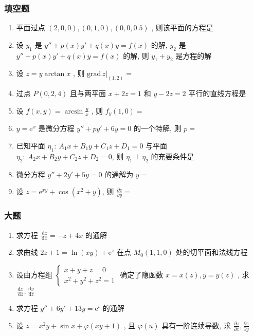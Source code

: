 \documentclass[cn,11pt,fancy,hide]{elegantbook}
\newcommand{\ee}{\mathrm{e}}
\newcommand{\dd}{\,\mathrm{d}}
\begin{document}
\subsubsection{填空题}
\begin{enumerate}
	\item 平面过点 $(2,0,0),(0,1,0),(0,0,0.5)$ , 则该平面的方程是\underline{\hspace{8pc}}
	\item 设 $y_1$ 是 $y''+p(x)y'+q(x)y=f(x)$ 的解, $y_2$ 是 $y''+p(x)y'+q(x)y=f(x)$ 的解, 则 $y_1+y_2$ 是\underline{\hspace{8pc}}方程的解
	\item 设 $z=y\arctan x$ , 则 $\left.\mathrm{grad}\,z\right|_{(1,2)}=$\underline{\hspace{8pc}}
	\item 过点 $P(0,2,4)$ 且与两平面 $x+2z=1$ 和 $y-2z=2$ 平行的直线方程是\underline{\hspace{8pc}}
	\item 设 $f(x,y)=\arcsin\frac{y}{x}$ , 则 $f_y(1,0)=$\underline{\hspace{8pc}}
	\item $y=\ee^x$ 是微分方程 $y''+py'+6y=0$ 的一个特解, 则 $p=$\underline{\hspace{8pc}}
	\item 已知平面 $\eta_1:\ A_1x+B_1y+C_1z+D_1=0$ 与平面 $\eta_2:\ A_2x+B_2y+C_2z+D_2=0$, 则 $\eta_1\perp\eta_2$ 的充要条件是\underline{\hspace{8pc}}
	\item 微分方程 $y''+2y'+5y=0$ 的通解为 $y=$\underline{\hspace{8pc}}
	\item 设 $z=\ee^{xy}+\cos\left(x^2+y\right)$, 则 $\frac{\partial z}{\partial y}=$\underline{\hspace{8pc}}
\end{enumerate}
\subsubsection{大题}
\begin{enumerate}
	\item 求方程 $\frac{\dd z}{\dd x}=-z+4x$ 的通解
	\item 求曲线 $2z+1=\ln(xy)+\ee^z$ 在点 $M_{0}(1,1,0)$ 处的切平面和法线方程
	\item 设由方程组 $\begin{cases}
	x+y+z=0\\
	x^2+y^2+z^2=1
	\end{cases}$
	确定了隐函数 $x=x(z),y=y(z)$ , 求 $\frac{\dd x}{\dd z},\frac{\dd y}{\dd z}$
	\item 求方程 $y''+6y'+13y=\ee^t$ 的通解
	\item 设 $z=x^2y+\sin x+\varphi(xy+1)$ , 且 $\varphi(u)$ 具有一阶连续导数, 求 $\frac{\partial z}{\partial x},\frac{\partial z}{\partial y}$
\end{enumerate}
\end{document}
